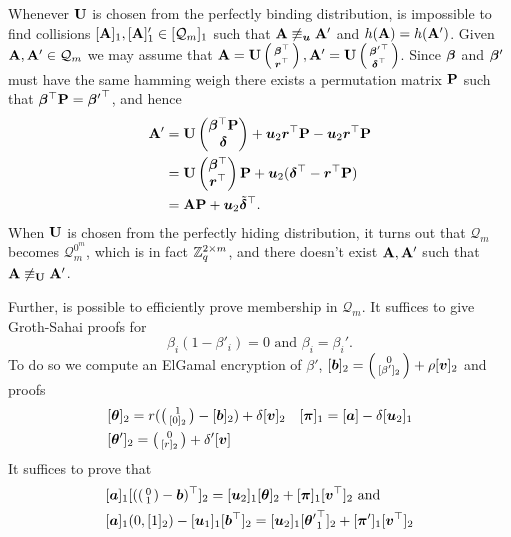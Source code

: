 Whenever $\mathbf{{U}}$ is chosen from the perfectly binding distribution, is impossible to find collisions $[\mathbf{{A}}]_1,[\mathbf{{A}}]_1'\in[\mathcal{Q}_m]_1$ such that $\mathbf{{A}}\not\equiv_{\boldsymbol{u}}\mathbf{{A}}'$ and $h(\mathbf{{A}})=h(\mathbf{{A}}')$. Given $\mathbf{{A}},\mathbf{{A}}'\in\mathcal{Q}_m$ we may assume that $\mathbf{{A}}=\mathbf{{U}}\left(\begin{smallmatrix}{\boldsymbol{\beta}}^\top\\{\boldsymbol{r}}^\top\end{smallmatrix}\right),\mathbf{{A}}'=\mathbf{{U}}\left(\begin{smallmatrix}{{\boldsymbol{\beta}}'}^\top\\{\boldsymbol{\delta}}^\top\end{smallmatrix}\right)$. Since ${\boldsymbol{\beta}}$ and ${\boldsymbol{\beta}}'$ must have the same hamming weigh there exists a permutation matrix $\mathbf{{P}}$ such that ${\boldsymbol{\beta}}^\top\mathbf{{P}} = {{\boldsymbol{\beta}}'}^\top$, and hence
\begin{align*}
\mathbf{{A}}' &= \mathbf{{U}}\left(\begin{matrix}{\boldsymbol{\beta}}^\top\mathbf{{P}}\\{\boldsymbol{\delta}}\end{matrix}\right)+ {\boldsymbol{u}}_2{\boldsymbol{r}}^\top\mathbf{{P}} - {\boldsymbol{u}}_2{\boldsymbol{r}}^\top\mathbf{{P}}\\
&=
\mathbf{{U}} \left(\begin{matrix}{\boldsymbol{\beta}}^\top\\{\boldsymbol{r}}^\top\end{matrix}\right)\mathbf{{P}} + {\boldsymbol{u}}_2({\boldsymbol{\delta}}^\top-{\boldsymbol{r}}^\top\mathbf{{P}})\\
 &=
 \mathbf{{A}}\mathbf{{P}} + {\boldsymbol{u}}_2\tilde{{\boldsymbol{\delta}}}^\top.
\end{align*}
When $\mathbf{{U}}$ is chosen from the perfectly hiding distribution, it turns out that $\mathcal{Q}_m$ becomes $\mathcal{Q}_m^{0^m}$, which is in fact $\mathbb{Z}_q^{2\times m}$, and there doesn't exist $\mathbf{{A}},\mathbf{{A}}'$ such that $\mathbf{{A}}\not\equiv_{\mathbf{{U}}}\mathbf{{A}}'$. 

Further, is possible to efficiently prove membership in $\mathcal{Q}_m$. It suffices to give Groth-Sahai proofs for
\begin{equation}
\beta_i(1-\beta'_i)=0\text{ and }\beta_i=\beta_i' \label{eq:Qm-memb}.
\end{equation}
To do so we compute an ElGamal encryption of $\beta'$, $[{\boldsymbol{b}}]_2 = \left(\begin{smallmatrix}0\\{[\beta']_2}\end{smallmatrix}\right)+\rho[{\boldsymbol{v}}]_2$ and proofs
\begin{align}
&[{\boldsymbol{\theta}}]_2 = r(\left(\begin{smallmatrix}1\\{[0]_2}\end{smallmatrix}\right)-[{\boldsymbol{b}}]_2)+\delta[{\boldsymbol{v}}]_2
&[{\boldsymbol{\pi}}]_1 = [{\boldsymbol{a}}]-\delta[{\boldsymbol{u}}_2]_1\\
&[{\boldsymbol{\theta}}']_2 = \left(\begin{smallmatrix}0\\{[r]_2}\end{smallmatrix}\right)+\delta'[{\boldsymbol{v}}]
\end{align}
 It suffices to prove that
\begin{align}
&[{\boldsymbol{a}}]_1[(\left(\begin{smallmatrix}0\\1\end{smallmatrix}\right)-{\boldsymbol{b}})^\top]_2 = [{\boldsymbol{u}}_2]_1[{\boldsymbol{\theta}}]_2+[{\boldsymbol{\pi}}]_1[{\boldsymbol{v}}^\top]_2\text{ and }\nonumber \\
&[{\boldsymbol{a}}]_1(0,[1]_2)-[{\boldsymbol{u}}_1]_1[{\boldsymbol{b}}^\top]_2 = [{\boldsymbol{u}}_2]_1[{{\boldsymbol{\theta}}'}^\top_1]_2 + [{\boldsymbol{\pi}}']_1[{\boldsymbol{v}}^\top]_2 \label{eq:Qm-memb-ElGamal}
\end{align}

